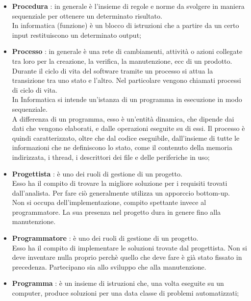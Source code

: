 \begin{itemize}
	\item \textbf{Procedura} : in generale è l'insieme di regole e norme da svolgere in maniera sequenziale per ottenere un determinato risultato. \\
In informatica (funzione) è un blocco di istruzioni che a partire da un certo input restituiscono un determinato output;

	\item \textbf{Processo} :  in generale è una rete di cambiamenti, attività o azioni collegate tra loro per la creazione, la verifica, la manutenzione, ecc di un prodotto. \\
Durante il ciclo di vita del software tramite un processo si attua la transizione tra uno stato e l'altro. Nel particolare vengono chiamati processi di ciclo di vita. \\
In Informatica si intende un'istanza di un programma in esecuzione in modo sequenziale. \\
A differenza di un programma, esso è un'entità dinamica, che dipende dai dati che vengono elaborati, e dalle operazioni eseguite su di essi. Il processo è quindi caratterizzato, oltre che dal codice eseguibile, dall'insieme di tutte le informazioni che ne definiscono lo stato, come il contenuto della memoria indirizzata, i thread, i descrittori dei file e delle periferiche in uso;
	
	\item \textbf{Progettista} : è uno dei ruoli di gestione di un progetto. \\
Esso ha il compito di trovare la migliore soluzione per i requisiti trovati dall'analista. Per fare ciò generalmente utilizza un apporccio bottom-up. \\
Non si occupa dell'implementazione, compito spettante invece al programmatore. La sua presenza nel progetto dura in genere fino alla manutenzione.
	
	\item \textbf{Programmatore} : è uno dei ruoli di gestione di un progetto. 	\\
Esso ha il compito di implementare le soluzioni trovate dal progettista. Non si deve inventare nulla proprio perchè quello che deve fare è già stato fissato in precedenza. Partecipano sia allo sviluppo che alla manutenzione.

	\item \textbf{Programma} : è un insieme di istruzioni che, una volta eseguite su un computer, produce soluzioni per una data classe di problemi automatizzati;

\end{itemize}